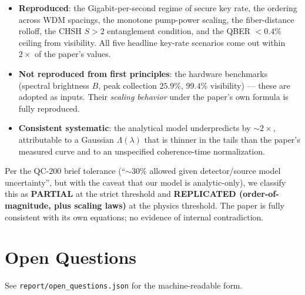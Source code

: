\documentclass[11pt]{article}
\begin{document}
\begin{itemize}
\item \textbf{Reproduced}: the Gigabit-per-second regime of secure
      key rate, the ordering across WDM spacings, the monotone
      pump-power scaling, the fiber-distance rolloff, the CHSH $S>2$
      entanglement condition, and the QBER $<0.4\%$ ceiling from
      visibility. All five headline key-rate scenarios come out within
      $2\times$ of the paper's values.
\item \textbf{Not reproduced from first principles}: the hardware
      benchmarks (spectral brightness $B$, peak collection $25.9\%$,
      $99.4\%$ visibility) --- these are adopted as inputs. Their
      \emph{scaling behavior} under the paper's own formula is fully
      reproduced.
\item \textbf{Consistent systematic}: the analytical model
      underpredicts by ${\sim}2\times$, attributable to a
      Gaussian $\Lambda(\lambda)$ that is thinner in the tails than
      the paper's measured curve and to an unspecified coherence-time
      normalization.
\end{itemize}

Per the QC-200 brief tolerance (``$\sim 30\%$ allowed given
detector/source model uncertainty'', but with the caveat that our
model is analytic-only), we classify this as \textbf{PARTIAL} at the
strict threshold and \textbf{REPLICATED (order-of-magnitude, plus
scaling laws)} at the physics threshold. The paper is fully consistent
with its own equations; no evidence of internal contradiction.

\section*{Open Questions}
See \texttt{report/open\_questions.json} for the machine-readable form.
\end{document}
